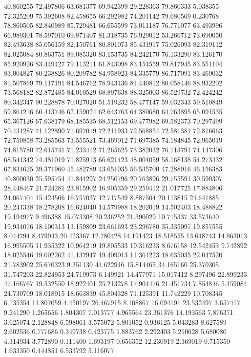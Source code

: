 40.860255
72.497806
63.681377
69.942399
29.228363
79.860333
5.038355
72.325209
75.392608
82.458655
66.292982
74.201142
79.680569
0.230768
78.860505
82.840989
85.729481
66.655599
73.011187
76.771077
63.493996
66.989301
78.597010
69.871407
81.318735
76.929012
53.266712
73.690050
82.493638
85.056159
82.150761
80.801073
85.431917
75.026093
82.319112
82.025084
80.863751
89.085320
83.153735
84.242170
76.133290
83.126170
85.920926
83.449427
79.113211
61.843098
83.154559
79.817945
83.551104
83.004827
80.238826
80.209782
84.958923
84.335779
86.717091
83.469032
81.507869
79.117191
84.546762
78.943436
81.440812
80.058446
88.932202
73.568182
82.872485
84.010529
68.897638
88.325003
86.529732
72.424242
80.342347
90.228878
70.027020
51.519232
58.477147
59.032343
59.510849
59.861216
60.413746
62.159024
62.643763
64.380680
64.763895
65.091535
65.367126
67.638179
68.185535
68.512153
69.477982
69.582373
70.297499
70.431287
71.122890
71.697019
72.211933
72.568854
72.581381
72.816663
72.750858
73.285563
73.555521
73.469012
71.697385
74.184845
72.965019
74.815780
72.615741
71.233412
71.265625
73.382032
76.113791
74.147306
68.544342
74.481019
71.825913
66.621423
48.004059
58.168138
54.273432
67.831625
39.371960
45.482789
43.651035
56.535700
47.288916
46.156383
40.800030
25.595754
41.844297
24.250796
20.763896
29.755591
30.590307
28.448467
21.724281
23.815902
16.905359
29.259412
21.017725
17.884806
24.067404
15.424506
16.757037
12.717549
8.887504
20.113815
24.641885
20.241338
18.278208
16.624040
14.579988
18.202019
14.502403
18.488822
19.194977
9.496388
15.073308
20.236252
21.390029
10.715337
33.573640
19.934076
18.100313
13.159809
23.661693
23.296780
35.335097
19.857555
8.044794
8.479943
20.423367
12.780428
14.191423
18.518555
13.648743
14.863013
16.995505
11.935322
10.964219
19.805533
19.316233
8.676158
12.542453
9.742892
18.025546
19.002262
41.137947
19.409013
11.361223
18.635035
22.047520
21.783902
25.670323
9.351130
44.622916
15.814465
34.165160
25.370305
31.747203
22.824953
24.719973
6.149921
14.477971
15.017412
8.297496
22.899233
47.166767
19.532550
18.922401
25.213278
17.904476
21.451734
7.854846
5.459084
24.730709
18.018915
18.663839
45.804328
71.125391
11.742229
10.708345
6.135354
11.807059
4.450197
26.467915
8.108867
16.094191
23.532497
3.657417
9.241290
1.265656
1.804307
7.013777
4.965564
23.361376
14.193563
7.876371
3.625074
2.128848
6.598061
3.575072
5.801052
0.936125
5.043283
8.627589
2.602536
0.777686
0.349738
0.423775
1.883762
2.292403
5.210628
5.680080
4.314934
3.772890
0.111400
1.693197
0.656352
12.230919
2.369019
0.715350
1.633350
0.444851
6.533792
5.116077
